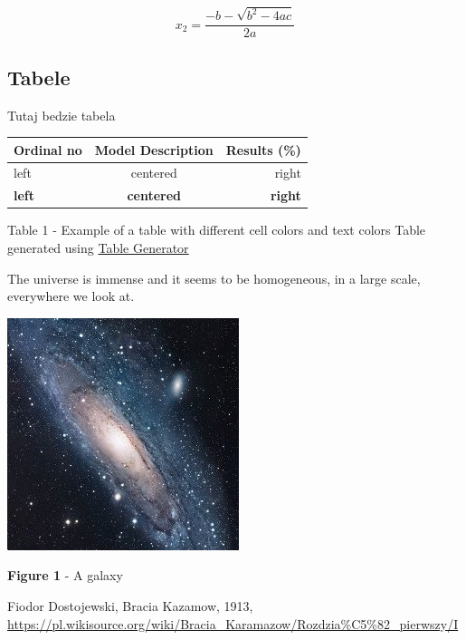 \documentclass{article}
\begin{document}
\begin{equation*}
x_2 = \frac{-b - \sqrt{b^2 - 4ac}}{2a}
\end{equation*}

\subsection{Tabele}

Tutaj bedzie tabela

\begin{center}
    \begin{table}[H]
        \centering
        \begin{tabular}{lcr}
        \toprule
        Ordinal no                   & \multicolumn{1}{l|}{Model Description}    & Results (\%)                          \\ \midrule
        \cellcolor[HTML]{9AFF99}left & {\color[HTML]{986536} centered}           & \cellcolor[HTML]{CBCEFB}right         \\ \midrule
        \textbf{left}                & \cellcolor[HTML]{FFFE65}\textbf{centered} & {\color[HTML]{6200C9} \textbf{right}} \\ \bottomrule
        \end{tabular}
    \end{table}
    Table 1 - Example of a table with different cell colors and text colors
    Table generated using \href{https://www.tablesgenerator.com/}{Table Generator}
\end{center}

The universe is immense and it seems to be homogeneous, in a large scale, everywhere we look at.


\begin{center}
    \includegraphics{galaxy.jpg}
\end{center}
\begin{center}
    \textbf{Figure 1} - A galaxy
\end{center}

\begin{thebibliography}{9}
 Fiodor Dostojewski, Bracia Kazamow, 1913, \url{https://pl.wikisource.org/wiki/Bracia_Karamazow/Rozdzia%C5%82_pierwszy/I}

\end{thebibliography}
\end{document}
